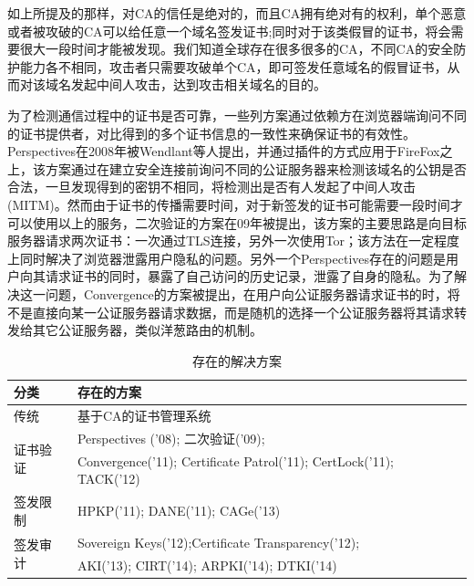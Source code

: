 如上所提及的那样，对CA的信任是绝对的，而且CA拥有绝对有的权利，单个恶意或者被攻破的CA可以给任意一个域名签发证书\supercite{ducklin2013turktrust};同时对于该类假冒的证书，将会需要很大一段时间才能被发现。我们知道全球存在很多很多的CA，不同CA的安全防护能力各不相同，攻击者只需要攻破单个CA，即可签发任意域名的假冒证书，从而对该域名发起中间人攻击，达到攻击相关域名的目的。





为了检测通信过程中的证书是否可靠，一些列方案通过依赖方在浏览器端询问不同的证书提供者，对比得到的多个证书信息的一致性来确保证书的有效性。Perspectives\supercite{wendlandt2008perspectives}在2008年被Wendlant等人提出，并通过插件的方式应用于FireFox之上，该方案通过在建立安全连接前询问不同的公证服务器来检测该域名的公钥是否合法，一旦发现得到的密钥不相同，将检测出是否有人发起了中间人攻击(MITM)。然而由于证书的传播需要时间，对于新签发的证书可能需要一段时间才可以使用以上的服务，二次验证\supercite{alicherry2009doublecheck}的方案在09年被提出，该方案的主要思路是向目标服务器请求两次证书：一次通过TLS连接，另外一次使用Tor\supercite{alicherry2009doublecheck}；该方法在一定程度上同时解决了浏览器泄露用户隐私的问题。另外一个Perspectives存在的问题是用户向其请求证书的同时，暴露了自己访问的历史记录，泄露了自身的隐私。为了解决这一问题，Convergence\supercite{convergence}的方案被提出，在用户向公证服务器请求证书的时，将不是直接向某一公证服务器请求数据，而是随机的选择一个公证服务器将其请求转发给其它公证服务器，类似洋葱路由的机制。

\renewcommand\arraystretch{2}
\begin{table}[h]
\centering
\begin{tabular}{p{2.5cm}p{12cm}}
	\hline
	分类 & 存在的方案 \\
	\hline
	传统 & \small 基于CA的证书管理系统 \\
	\hline
	\multirow{2}{*}{证书验证} & \small Perspectives ('08)\parencite{wendlandt2008perspectives}; 二次验证('09)\parencite{alicherry2009doublecheck};   \\ \cline{2-2}
	& \small Convergence('11)\parencite{convergence}; Certificate Patrol('11)\parencite{modell2014certificate}; CertLock('11)\parencite{soghoian2011certified}; TACK('12)\parencite{marlinspike2012internet} \\
	\hline
	签发限制 & \small HPKP('11)\parencite{evans2015public}; DANE('11)\parencite{barnes2011dane}; CAGe('13)\parencite{kasten2013cage} \\
	\hline
	\multirow{2}{*}{签发审计} & \small Sovereign Keys('12)\parencite{eckersley2012internet};Certificate Transparency('12)\parencite{laurie2013certificate}; \\ \cline{2-2}
	& \small AKI('13)\parencite{kim2013accountable}; CIRT('14)\parencite{ryan2014enhanced}; ARPKI('14)\parencite{basin2014arpki}; DTKI('14)\parencite{cheval2014dtki}	 \\
	\hline
	
\end{tabular}
\caption{存在的解决方案}\label{proposed} %
\end{table}

